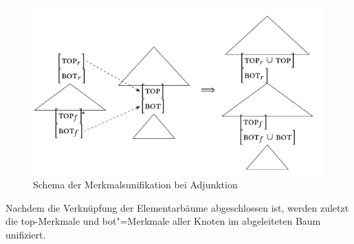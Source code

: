 \begin{figure}[t]
\centering
\includegraphics{graphics/abb54.pdf}
\caption{Schema der Merkmalsunifikation bei Adjunktion\label{fig-tag-merkmal-2}}
\end{figure}    
Nachdem die Verknüpfung der Elementarbäume abgeschlossen ist, werden zuletzt die {\sc top}-Merkmale und {\sc bot}"=Merkmale aller Knoten im abgeleiteten Baum unifiziert. 

